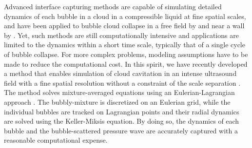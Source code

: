 \documentclass{jfm}
\begin{document}
Advanced interface capturing methods are capable of simulating detailed dynamics of each bubble in a cloud in a compressible liquid at fine spatial scales, and have been applied to bubble cloud collapse in a free field by \citet{Rossinelli13,Rasthofer17} and near a wall by \citet{Tiwari15}.
Yet, such methods are still computationally intensive and applications are limited to the dynamics within a short time scale, typically that of a single cycle of bubble collapse. For more complex problems, modeling assumptions have to be made to reduce the computational cost. In this spirit, we have recently developed a method that enables simulation of cloud cavitation in an intense ultrasound field with a fine spatial resolution without a constraint of the scale separation \citep{Maeda17b}. The method solves mixture-averaged equations using an Eulerian-Lagrangian approach \citep{Kameda96,Fuster11,Ma18}. The bubbly-mixture is discretized on an Eulerian grid, while the individual bubbles are tracked on Lagrangian points and their radial dynamics are solved using the Keller-Miksis equation. By doing so, the dynamics of each bubble and the bubble-scattered pressure wave are accurately captured with a reasonable computational expense.
\end{document}
